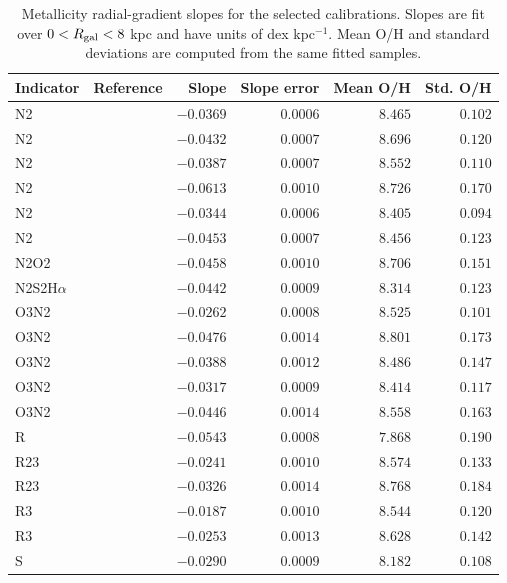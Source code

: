 \begin{table}
\centering
\caption{Metallicity radial-gradient slopes for the selected calibrations. Slopes are fit over $0<R_{\rm gal}<8$ kpc and have units of dex kpc$^{-1}$. Mean O/H and standard deviations are computed from the same fitted samples.}
\label{tab:metallicity_gradient_slopes}
\begin{tabular}{llrrrr}
\hline
Indicator & Reference & Slope & Slope error & Mean O/H & Std. O/H \\
\hline
N2 & \citet{Brazzini_2024} & $-0.0369$ & $0.0006$ & $8.465$ & $0.102$ \\
N2 & \citet{Brown_2016} & $-0.0432$ & $0.0007$ & $8.696$ & $0.120$ \\
N2 & \citet{Curti_2017} & $-0.0387$ & $0.0007$ & $8.552$ & $0.110$ \\
N2 & \citet{Maiolino_2008} & $-0.0613$ & $0.0010$ & $8.726$ & $0.170$ \\
N2 & \citet{Marino_2013} & $-0.0344$ & $0.0006$ & $8.405$ & $0.094$ \\
N2 & \citet{Pettini_2004} & $-0.0453$ & $0.0007$ & $8.456$ & $0.123$ \\
\hline
N2O2 & \citet{Brown_2016} & $-0.0458$ & $0.0010$ & $8.706$ & $0.151$ \\
\hline
N2S2H$\alpha$ & \citet{Brazzini_2024} & $-0.0442$ & $0.0009$ & $8.314$ & $0.123$ \\
\hline
O3N2 & \citet{Brazzini_2024} & $-0.0262$ & $0.0008$ & $8.525$ & $0.101$ \\
O3N2 & \citet{Brown_2016} & $-0.0476$ & $0.0014$ & $8.801$ & $0.173$ \\
O3N2 & \citet{Curti_2017} & $-0.0388$ & $0.0012$ & $8.486$ & $0.147$ \\
O3N2 & \citet{Marino_2013} & $-0.0317$ & $0.0009$ & $8.414$ & $0.117$ \\
O3N2 & \citet{Pettini_2004} & $-0.0446$ & $0.0014$ & $8.558$ & $0.163$ \\
\hline
R & \citet{Pilyugin_2016} & $-0.0543$ & $0.0008$ & $7.868$ & $0.190$ \\
\hline
R23 & \citet{Curti_2017} & $-0.0241$ & $0.0010$ & $8.574$ & $0.133$ \\
R23 & \citet{Maiolino_2008} & $-0.0326$ & $0.0014$ & $8.768$ & $0.184$ \\
\hline
R3 & \citet{Brazzini_2024} & $-0.0187$ & $0.0010$ & $8.544$ & $0.120$ \\
R3 & \citet{Curti_2017} & $-0.0253$ & $0.0013$ & $8.628$ & $0.142$ \\
\hline
S & \citet{Pilyugin_2016} & $-0.0290$ & $0.0009$ & $8.182$ & $0.108$ \\
\hline
\end{tabular}
\end{table}
